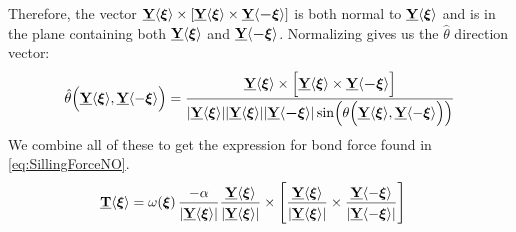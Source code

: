 Therefore, the vector $\vstate{Y}{}{\boldsymbol{\xi}}\times\left[\vstate{Y}{}{\boldsymbol{\xi}}\times\vstate{Y}{}{\boldsymbol{-\xi}}\right]$ is both normal to $\vstate{Y}{}{\boldsymbol{\xi}}$ and is in the plane containing both $\vstate{Y}{}{\boldsymbol{\xi}}$ and $\vstate{Y}{}{\boldsymbol{-\xi}}$.
Normalizing gives us the $\hat{\theta}$ direction vector:
%
\begin{equation}
\hat{\theta}\!\left(\tvstate{Y}{}{\boldsymbol{\xi}},\tvstate{Y}{}{-\boldsymbol{\xi}}\right)=
\frac{\tvstate{Y}{}{\boldsymbol{\xi}}\times\left[\tvstate{Y}{}{\boldsymbol{\xi}}\times\tvstate{Y}{}{\boldsymbol{-\xi}}\right]}{|\tvstate{Y}{}{\boldsymbol{\xi}}||\tvstate{Y}{}{\boldsymbol{\xi}}||\tvstate{Y}{}{\boldsymbol{-\xi}}|\sin\!\left(\theta\!\left(\tvstate{Y}{}{\boldsymbol{\xi}},\tvstate{Y}{}{-\boldsymbol{\xi}}\right)\right)}\notag 
\end{equation}
%
We combine all of these to get the expression for bond force found in \cref{eq:SillingForceNO}.
\begin{align}
%
\tvstate{T}{}{\boldsymbol{\xi}} &=
\omega\!\left(\boldsymbol{\xi}\right)\frac{-\alpha}{|\tvstate{Y}{}{\boldsymbol{\xi}}|} \frac{\tvstate{Y}{}{\boldsymbol{\xi}}}{|\tvstate{Y}{}{\boldsymbol{\xi}}|} \times 
\left[\frac{\tvstate{Y}{}{\boldsymbol{\xi}}}{|\tvstate{Y}{}{\boldsymbol{\xi}}|} \times 
\frac{\tvstate{Y}{}{-\boldsymbol{\xi}}}{|\tvstate{Y}{}{-\boldsymbol{\xi}}|}\right]\notag
\end{align}
%
